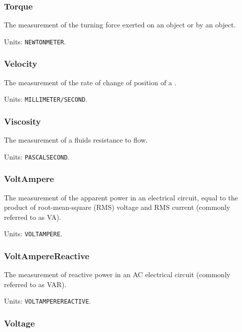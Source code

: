 \subsubsection{Torque}
\label{sec:Torque}



The measurement of the turning force exerted on an object or by an object.


Units: \texttt{NEWTON\textunderscore METER}.

\subsubsection{Velocity}
\label{sec:Velocity}



The measurement of the rate of change of position of a .


Units: \texttt{MILLIMETER/SECOND}.

\subsubsection{Viscosity}
\label{sec:Viscosity}



The measurement of a fluids resistance to flow.


Units: \texttt{PASCAL\textunderscore SECOND}.

\subsubsection{VoltAmpere}
\label{sec:VoltAmpere}



The measurement of the apparent power in an electrical circuit, equal to the product of root-mean-square (RMS) voltage and RMS current (commonly referred to as VA).


Units: \texttt{VOLT\textunderscore AMPERE}.

\subsubsection{VoltAmpereReactive}
\label{sec:VoltAmpereReactive}



The measurement of reactive power in an AC electrical circuit (commonly referred to as VAR).


Units: \texttt{VOLT\textunderscore AMPERE\textunderscore REACTIVE}.

\subsubsection{Voltage}
\label{sec:Voltage}



